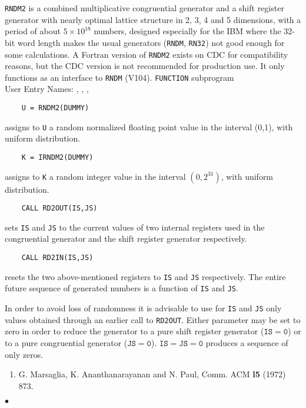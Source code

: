                        
             
             
{\tt RNDM2} is a combined multiplicative congruential generator and
a shift register generator with nearly optimal lattice structure in
2, 3, 4 and 5 dimensions, with a period of about $5 \times 10^{18}$
numbers, designed especially for the IBM where the 32-bit word length
makes the usual generators ({\tt RNDM}, {\tt RN32}) not good enough for
some calculations.
A Fortran version of {\tt RNDM2} exists on CDC for compatibility
reasons, but the CDC version is not recommended for production
use. It only functions as an interface to {\tt RNDM} (V104).
\Structure
{\tt FUNCTION} subprogram \\
User Entry Names: , , ,
\Usage
\begin{verbatim}
    U = RNDM2(DUMMY)
\end{verbatim}
assigns to {\tt U} a random normalized floating point value in the
interval (0,1), with uniform distribution.
\begin{verbatim}
    K = IRNDM2(DUMMY)
\end{verbatim}
assigns to {\tt K} a random integer value in the interval $(0,2^{31})$,
with uniform distribution.
\begin{verbatim}
    CALL RD2OUT(IS,JS)
\end{verbatim}
sets {\tt IS} and {\tt JS} to the current values of two internal
registers used in the congruential generator and the shift register
generator respectively.
\begin{verbatim}
    CALL RD2IN(IS,JS)
\end{verbatim}
resets the two above-mentioned registers to {\tt IS} and {\tt JS}
respectively. The entire future sequence of generated numbers is a
function of {\tt IS} and {\tt JS}.
\par
In order to avoid loss of randomness it is advisable to use for
{\tt IS} and {\tt JS} only values obtained through an earlier call to
{\tt RD2OUT}. Either parameter may be set to zero in order to reduce the
generator to a pure shift register generator ($\mathtt{IS=0}$) or to a
pure congruential generator ($\mathtt{JS=0}$).
$\mathtt{IS=JS=0}$ produces a sequence of only zeros.
\Refer
\begin{enumerate}
\item G. Marsaglia, K. Ananthanarayanan and N. Paul,
Comm. ACM {\bf l5} (1972) 873.
\end{enumerate}
$\bullet$
